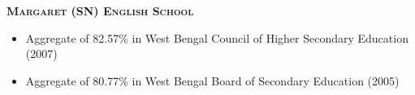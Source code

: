 \documentclass{article}
\begin{document}
{\raggedright{\textsc{\textbf{Margaret (SN) English School}}}} \hfill {}
\begin{itemize}[noitemsep,nolistsep]
\item Aggregate of 82.57\% in West Bengal Council of Higher Secondary Education (2007)
\item Aggregate of 80.77\% in West Bengal Board of Secondary Education (2005)
\end{itemize}
\end{document}
